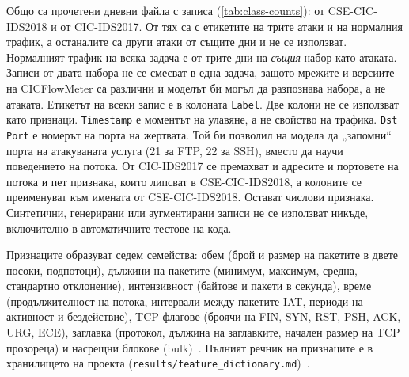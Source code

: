 Общо са прочетени  дневни файла с  записа (\cref{tab:class-counts}):  от CSE-CIC-IDS2018 и  от CIC-IDS2017. От тях  са с етикетите на трите атаки и на нормалния трафик, а останалите  са други атаки от същите дни и не се използват. Нормалният трафик на всяка задача е от трите дни на \emph{същия} набор като атаката. Записи от двата набора не се смесват в една задача, защото мрежите и версиите на CICFlowMeter са различни и моделът би могъл да разпознава набора, а не атаката. Етикетът на всеки запис е в колоната \texttt{Label}. Две колони не се използват като признаци. \texttt{Timestamp} е моментът на улавяне, а не свойство на трафика. \texttt{Dst Port} е номерът на порта на жертвата. Той би позволил на модела да „запомни“ порта на атакуваната услуга (21 за FTP, 22 за SSH), вместо да научи поведението на потока. От CIC-IDS2017 се премахват и адресите и портовете на потока и пет признака, които липсват в CSE-CIC-IDS2018, а колоните се преименуват към имената от CSE-CIC-IDS2018. Остават  числови признака. Синтетични, генерирани или аугментирани записи не се използват никъде, включително в автоматичните тестове на кода.

\begin{table}[H]
\centering\small
\caption{Изтеглени записи по етикет преди и след почистване}\label{tab:class-counts}

\end{table}

Признаците образуват седем семейства: обем (брой и размер на пакетите в двете посоки, подпотоци), дължини на пакетите (минимум, максимум, средна, стандартно отклонение), интензивност (байтове и пакети в секунда), време (продължителност на потока, интервали между пакетите IAT, периоди на активност и бездействие), TCP флагове (броячи на FIN, SYN, RST, PSH, ACK, URG, ECE), заглавка (протокол, дължина на заглавките, начален размер на TCP прозореца) и насрещни блокове (bulk)~\cite{sharafaldin2018}. Пълният речник на признаците е в хранилището на проекта (\texttt{results/feature\_dictionary.md})~\cite{repo}.

